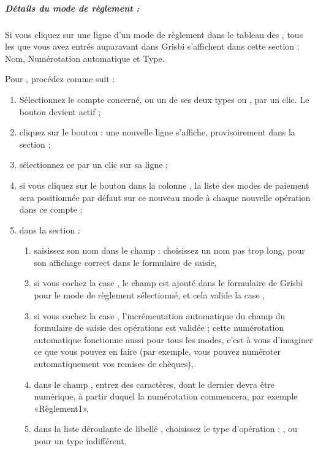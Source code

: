 \subparagraph{Détails du  mode de règlement :\label{setup-resources-modes-details}}


Si vous cliquez sur une ligne d'un mode de règlement dans le tableau des , tous les  que vous avez entrés auparavant dans Grisbi s'affichent dans cette section : Nom, Numérotation automatique et Type.


Pour , procédez comme suit :

\begin{enumerate}
	\item Sélectionnez le compte concerné, ou un de ses deux types  ou  , par un clic. Le bouton  devient actif ;
	\item cliquez sur le bouton  : une nouvelle ligne  s'affiche, provisoirement dans la section  ;
	\item sélectionnez ce  par un clic sur sa ligne ;
	\item si vous cliquez sur le bouton dans la colonne  , la liste des modes de paiement sera positionnée par défaut sur ce nouveau mode à chaque nouvelle opération dans ce compte ;
	\item dans la section  :
		\begin{enumerate}
			\item saisissez son nom dans le champ  : choisissez un nom pas trop long, pour son affichage correct dans le formulaire de saisie,
			\item si vous cochez la case , le champ  est ajouté dans le formulaire de Grisbi pour le mode de règlement sélectionné, et cela valide la case ,
			\item si vous cochez la case , l'incrémentation automatique du champ  du formulaire de saisie des opérations est validée ; cette numérotation automatique fonctionne aussi pour tous les modes, c'est à vous d'imaginer ce que vous pouvez en faire (par exemple, vous pouvez numéroter automatiquement vos remises de chèques),
			\item dans le champ , entrez des caractères, dont le dernier devra être numérique, à partir duquel la numérotation commencera, par exemple «Règlement1»,
			\item dans la liste déroulante de libellé  , choisissez le type d'opération : ,  ou  pour un type indifférent.
		\end{enumerate}
\end{enumerate}

